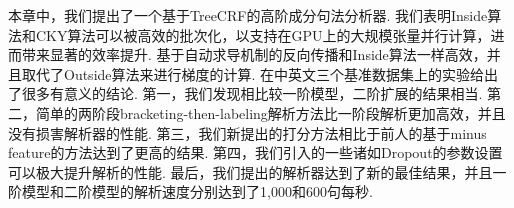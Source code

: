 本章中，我们提出了一个基于TreeCRF的高阶成分句法分析器.
我们表明Inside算法和CKY算法可以被高效的批次化，以支持在GPU上的大规模张量并行计算，进而带来显著的效率提升.
基于自动求导机制的反向传播和Inside算法一样高效，并且取代了Outside算法来进行梯度的计算.
在中英文三个基准数据集上的实验给出了很多有意义的结论.
第一，我们发现相比较一阶模型，二阶扩展的结果相当.
第二，简单的两阶段bracketing-then-labeling解析方法比一阶段解析更加高效，并且没有损害解析器的性能.
第三，我们新提出的打分方法相比于前人的基于minus feature的方法达到了更高的结果.
第四，我们引入的一些诸如Dropout的参数设置可以极大提升解析的性能.
最后，我们提出的解析器达到了新的最佳结果，并且一阶模型和二阶模型的解析速度分别达到了1,000和600句每秒.

